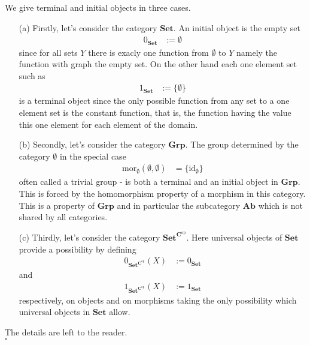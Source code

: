 \begin{exa}
\label{exa:uniobj}
We give terminal and initial objects in three cases.
\begin{enumerate}
\item[(a)]
Firstly, let's consider the category $\mathbf{Set}$. An initial object is the empty set
\begin{align*}
  0_{\mathbf{Set}}
  &:=
  \emptyset
\end{align*}
since for all sets $Y$ there is exacly one function from $\emptyset$ to $Y$ namely the function with graph the empty set. On the other hand each one element set such as
\begin{align*}
  1_{\mathbf{Set}}
  &:=
  \lbrace
    \emptyset
  \rbrace
\end{align*}
is a terminal object since the only possible function from any set to a one element set is the constant function, that is, the function having the value this one element for each element of the domain. 
\item[(b)]
Secondly, let's consider the category $\mathbf{Grp}$. The group determined by the category $\pmb{\emptyset}$ in the special case
\begin{align*}
  \mathrm{mor}_{\pmb{\emptyset}}(\emptyset,\emptyset)
  &=
  \lbrace
    \mathrm{id}_{\emptyset}
  \rbrace
\end{align*}
often called a trivial group - is both a terminal and an initial object in $\mathbf{Grp}$. This is forced by the homomorphism property of a morphism in this category. This is a property of $\mathbf{Grp}$ and in particular the subcategory $\mathbf{Ab}$ which is not shared by all categories.
\item[(c)]
Thirdly, let's consider the category $\mathbf{Set}^{\mathbf{C}^{\mathrm{op}}}$. Here universal objects of $\mathbf{Set}$ provide a possibility by defining
\begin{align*}
  0_{\mathbf{Set}^{\mathbf{C}^{\mathrm{op}}}}(X)
  &:=
  0_{\mathbf{Set}}
\end{align*}
and
\begin{align*}
  1_{\mathbf{Set}^{\mathbf{C}^{\mathrm{op}}}}(X)
  &:=
  1_{\mathbf{Set}}
\end{align*}
respectively, on objects and on morphisms taking the only possibility which universal objects in $\mathbf{Set}$ allow.
\end{enumerate}
\end{exa}
\begin{prf}
The details are left to the reader.
\\
\phantom{proven}
\hfill
$\square$
\end{prf}
